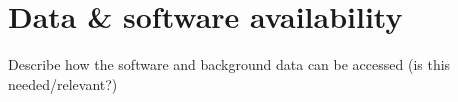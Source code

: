 \section{Data \& software availability}
\label{sec:availability}

Describe how the software and background data can be accessed (is this needed/relevant?)

